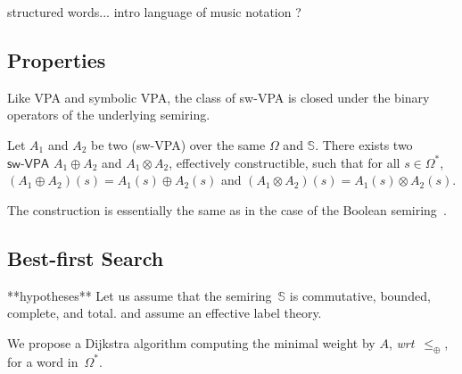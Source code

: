 \documentclass[runningheads]{llncs}
\def\wrt{\textit{wrt}\xspace}
\newcommand{\Semiring}{\mathbb{S}}
\def\SWVPA{\textsf{sw-VPA}\xspace}
\newcommand{\call}[1]{\ensuremath #1} %
\newcommand{\return}[1]{\ensuremath #1} %
\def\Omegai{{\Omega_\mathsf{i}}}
\def\Omegac{{\Omega_\mathsf{c}}}
\def\Omegar{{\Omega_\mathsf{r}}}
\def\Phii{{\Phi_\mathsf{i}}}
\def\Phir{{\Phi_\mathsf{r}}}
\def\Phicr{{\Phi_\mathsf{cr}}}
\begin{document}
\begin{example}
structured words...
intro language of music notation ?
\end{example}


\subsection{Properties}
Like VPA and symbolic VPA, 
the class of \SWVPA is closed under the binary operators of the underlying semiring.
%
\begin{proposition}
Let $A_1$ and $A_2$ be two (\SWVPA)
over the same $\Omega$ and $\Semiring$.
There exists two $\SWVPA$ $A_1 \oplus A_2$ and $A_1 \otimes A_2$, 
effectively constructible, 
such that for all $s \in \Omega^*$, 
$(A_1 \oplus A_2)(s) = A_1(s) \oplus A_2(s)$ and 
$(A_1 \otimes A_2)(s) = A_1(s) \otimes A_2(s)$.
\end{proposition}
The construction is essentially the same 
as in the case of the Boolean semiring~\cite{dAntonyAlur14SVPDA}.


\subsection{Best-first Search} 
\label{sec:best}\label{sec:search}
**hypotheses**
Let us assume that the semiring~$\Semiring$ is
commutative, bounded, complete, and total.
and assume an effective label theory.


We propose a Dijkstra algorithm computing the minimal weight by $A$, 
\wrt~$\leq_\oplus$, for a word in~$\Omega^*$.
\end{document}
